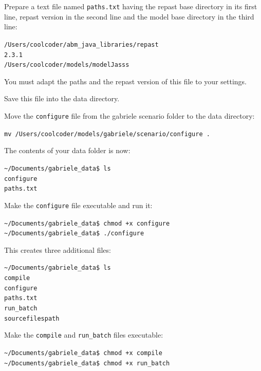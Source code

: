 \documentclass{book}
\begin{document}
Prepare a text file named \verb+paths.txt+ having the repast base directory in its first line, repast version in the second line and the model base directory in the third line:

\color{magenta}
\vskip2mm \noindent
\verb+/Users/coolcoder/abm_java_libraries/repast+ \\
\verb+2.3.1+ \\
\verb+/Users/coolcoder/models/modelJasss+
\vskip2mm

\color{black}
You must adapt the paths and the repast version of this file to your settings.

Save this file into the data directory.

Move the \verb+configure+ file from the gabriele scenario folder to the data directory:

\verb+mv /Users/coolcoder/models/gabriele/scenario/configure . +


The contents of your data folder is now:

\vskip2mm
\noindent\verb+~/Documents/gabriele_data$ +\color{red}\verb+ls+ \color{blue}\\
\verb+configure+ \\
\verb+paths.txt+
\color{black}

\vskip2mm
Make the \verb+configure+ file executable and run it:

\vskip2mm
\noindent\verb+~/Documents/gabriele_data$ +\color{red}\verb|chmod +x configure| \color{black}\\
\verb+~/Documents/gabriele_data$ +\color{red}\verb|./configure| \color{black}

\vskip2mm
This creates three additional files:

\vskip2mm
\noindent\verb+~/Documents/gabriele_data$ +\color{red}\verb+ls+ \color{blue}\\
\verb+compile+\\ \color{green}
\verb+configure+\\ \color{blue}
\verb+paths.txt+ \\
\verb+run_batch+ \\
\verb+sourcefilespath+
\color{black}

\vskip2mm
Make the \verb+compile+ and \verb+run_batch+ files executable:

\vskip2mm
\noindent\verb+~/Documents/gabriele_data$ +\color{red}\verb|chmod +x compile| \color{black}\\
\verb+~/Documents/gabriele_data$ +\color{red}\verb|chmod +x run_batch| \color{black}
\vskip2mm
\end{document}
